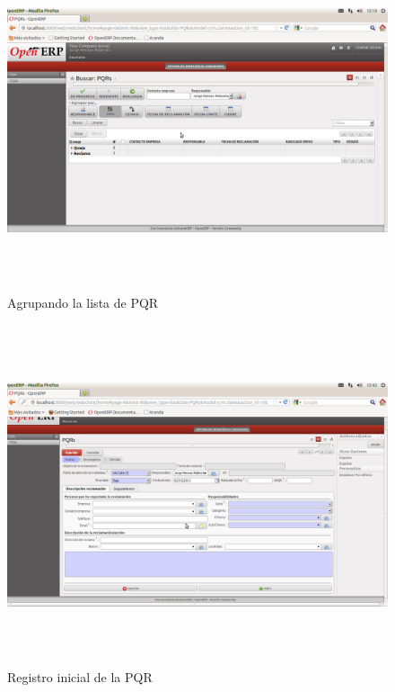 \begin{figure}
 \centering
 \includegraphics[width=15cm,height=10cm]{./Imagenes/menulistagroup.png}
 \caption{Agrupando la lista de PQR}
 \label{fig:menulistagroup}
\end{figure}

\begin{figure}
 \centering
 \includegraphics[width=15cm,height=10cm]{./Imagenes/formularioregistro.png}
 \caption{Registro inicial de la PQR}
 \label{fig:formularioregistro}
\end{figure}

